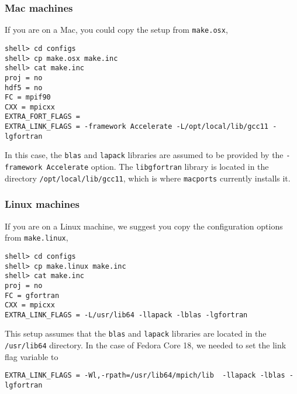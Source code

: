 \documentclass[11pt]{article}
\begin{document}
\subsubsection{Mac machines}
If you are on a Mac, you could copy the setup from \verb+make.osx+,
\begin{verbatim}
shell> cd configs
shell> cp make.osx make.inc
shell> cat make.inc
proj = no
hdf5 = no
FC = mpif90
CXX = mpicxx
EXTRA_FORT_FLAGS = 
EXTRA_LINK_FLAGS = -framework Accelerate -L/opt/local/lib/gcc11 -lgfortran
\end{verbatim}
In this case, the \verb+blas+ and \verb+lapack+ libraries are assumed to be provided by the \verb+-framework Accelerate+ option. The \verb+libgfortran+ library is located in the directory \verb+/opt/local/lib/gcc11+, which is where \verb+macports+ currently installs it.

\subsubsection{Linux machines}
If you are on a Linux machine, we suggest you copy the configuration options from \verb+make.linux+,
\begin{verbatim}
shell> cd configs
shell> cp make.linux make.inc
shell> cat make.inc
proj = no
FC = gfortran
CXX = mpicxx
EXTRA_LINK_FLAGS = -L/usr/lib64 -llapack -lblas -lgfortran
\end{verbatim}
This setup assumes that the \verb+blas+ and \verb+lapack+ libraries are located in the
\verb+/usr/lib64+ directory. 
In the case of Fedora Core 18, we needed to set the link flag variable to
\begin{verbatim}
EXTRA_LINK_FLAGS = -Wl,-rpath=/usr/lib64/mpich/lib  -llapack -lblas -lgfortran
\end{verbatim}
\end{document}
